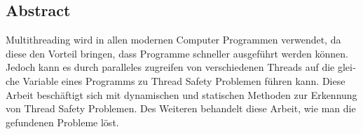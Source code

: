 \begin{otherlanguage}{ngerman}
	\chapter*{Abstract}
	Multithreading wird in allen modernen Computer Programmen verwendet, da diese den Vorteil bringen, dass Programme  schneller ausgeführt werden können. Jedoch kann es durch paralleles zugreifen von verschiedenen  Threads auf die gleiche Variable eines Programms zu Thread Safety Problemen führen kann. Diese Arbeit beschäftigt sich mit dynamischen und statischen Methoden zur Erkennung von Thread Safety Problemen. Des Weiteren behandelt diese Arbeit, wie man die gefundenen Probleme löst.
\end{otherlanguage}
